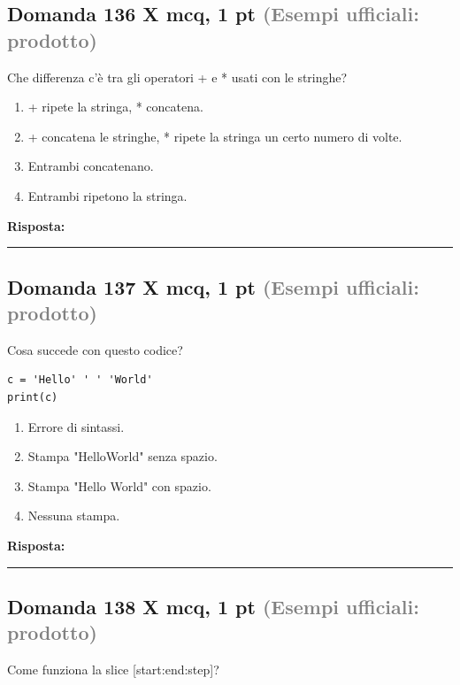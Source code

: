 \documentclass[a4paper,11pt]{article}
\begin{document}
\subsection*{Domanda 136 X \hfill {\small mcq, 1 pt \textcolor{gray}{(Esempi ufficiali: prodotto)}}}
Che differenza c'è tra gli operatori + e * usati con le stringhe?

\begin{enumerate}[label=\alph*)]
\item + ripete la stringa, * concatena.
\item + concatena le stringhe, * ripete la stringa un certo numero di volte.
\item Entrambi concatenano.
\item Entrambi ripetono la stringa.
\end{enumerate}
\vspace{0.2cm}
\noindent\textbf{Risposta:}\par
\vspace{1.5cm}\hrule


\subsection*{Domanda 137 X \hfill {\small mcq, 1 pt \textcolor{gray}{(Esempi ufficiali: prodotto)}}}
Cosa succede con questo codice?
\begin{verbatim}
c = 'Hello' ' ' 'World'
print(c)
\end{verbatim}

\begin{enumerate}[label=\alph*)]
\item Errore di sintassi.
\item Stampa "HelloWorld" senza spazio.
\item Stampa "Hello World" con spazio.
\item Nessuna stampa.
\end{enumerate}
\vspace{0.2cm}
\noindent\textbf{Risposta:}\par
\vspace{1.5cm}\hrule


\subsection*{Domanda 138 X \hfill {\small mcq, 1 pt \textcolor{gray}{(Esempi ufficiali: prodotto)}}}
Come funziona la slice [start:end:step]?
\end{document}
